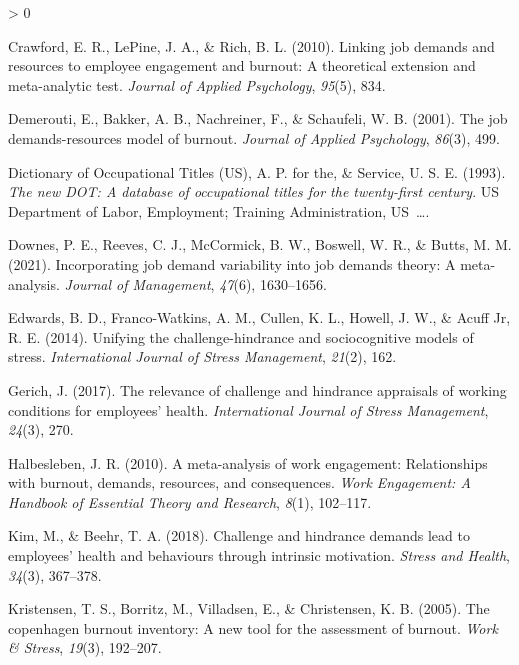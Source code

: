 \documentclass[
  english,
  man]{apa6}
\newlength{\cslhangindent}
\newenvironment{CSLReferences}[2] %
 {%
  \setlength{\parindent}{0pt}
  \ifodd #1 \everypar{\setlength{\hangindent}{\cslhangindent}}\ignorespaces\fi
  \ifnum #2 > 0
  \setlength{\parskip}{#2\baselineskip}
  \fi
 }%
 {}
\begin{document}
\begin{CSLReferences}{1}{0}
\leavevmode\hypertarget{ref-crawford2010linking}{}%
Crawford, E. R., LePine, J. A., \& Rich, B. L. (2010). Linking job demands and resources to employee engagement and burnout: A theoretical extension and meta-analytic test. \emph{Journal of Applied Psychology}, \emph{95}(5), 834.

\leavevmode\hypertarget{ref-demerouti2001job}{}%
Demerouti, E., Bakker, A. B., Nachreiner, F., \& Schaufeli, W. B. (2001). The job demands-resources model of burnout. \emph{Journal of Applied Psychology}, \emph{86}(3), 499.

\leavevmode\hypertarget{ref-advisory1993new}{}%
Dictionary of Occupational Titles (US), A. P. for the, \& Service, U. S. E. (1993). \emph{The new DOT: A database of occupational titles for the twenty-first century}. US Department of Labor, Employment; Training Administration, US~\ldots.

\leavevmode\hypertarget{ref-downes2021incorporating}{}%
Downes, P. E., Reeves, C. J., McCormick, B. W., Boswell, W. R., \& Butts, M. M. (2021). Incorporating job demand variability into job demands theory: A meta-analysis. \emph{Journal of Management}, \emph{47}(6), 1630--1656.

\leavevmode\hypertarget{ref-edwards2014unifying}{}%
Edwards, B. D., Franco-Watkins, A. M., Cullen, K. L., Howell, J. W., \& Acuff Jr, R. E. (2014). Unifying the challenge-hindrance and sociocognitive models of stress. \emph{International Journal of Stress Management}, \emph{21}(2), 162.

\leavevmode\hypertarget{ref-gerich2017relevance}{}%
Gerich, J. (2017). The relevance of challenge and hindrance appraisals of working conditions for employees' health. \emph{International Journal of Stress Management}, \emph{24}(3), 270.

\leavevmode\hypertarget{ref-halbesleben2010meta}{}%
Halbesleben, J. R. (2010). A meta-analysis of work engagement: Relationships with burnout, demands, resources, and consequences. \emph{Work Engagement: A Handbook of Essential Theory and Research}, \emph{8}(1), 102--117.

\leavevmode\hypertarget{ref-kim2018challenge}{}%
Kim, M., \& Beehr, T. A. (2018). Challenge and hindrance demands lead to employees' health and behaviours through intrinsic motivation. \emph{Stress and Health}, \emph{34}(3), 367--378.

\leavevmode\hypertarget{ref-kristensen2005copenhagen}{}%
Kristensen, T. S., Borritz, M., Villadsen, E., \& Christensen, K. B. (2005). The copenhagen burnout inventory: A new tool for the assessment of burnout. \emph{Work \& Stress}, \emph{19}(3), 192--207.


\end{CSLReferences}
\end{document}
